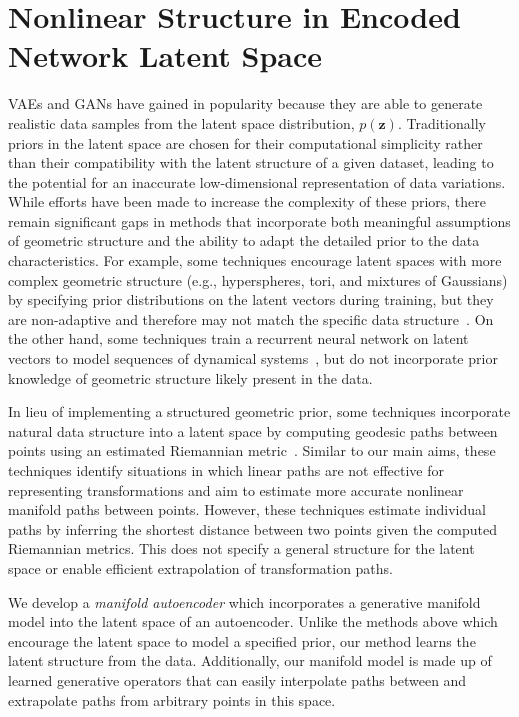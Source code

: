 \documentclass[letterpaper]{article} %
\newcommand{\vtr}[1]{\ensuremath{\mathbf{#1}}}
\begin{document}
\section{Nonlinear Structure in Encoded Network Latent Space}\label{sec:background}
VAEs and GANs have gained in popularity because they are able to generate realistic data samples from the latent space distribution, $p(\vtr{z})$. Traditionally priors in the latent space are chosen for their computational simplicity rather than their compatibility with the latent structure of a given dataset, leading to the potential for an inaccurate low-dimensional representation of data variations. While efforts have been made to increase the complexity of these priors, there remain significant gaps in methods that incorporate both meaningful assumptions of geometric structure and the ability to adapt the detailed prior to the data characteristics. For example, some techniques encourage latent spaces with more complex geometric structure (e.g., hyperspheres, tori, and mixtures of Gaussians) by specifying prior distributions on the latent vectors during training, but they are non-adaptive and therefore may not match the specific data structure~\cite{tomczak2017vae,davidson2018hyperspherical,makhzani2015adversarial,falorsi2018explorations,rey2019diffusion}. On the other hand, some techniques train a recurrent neural network on latent vectors to model sequences of dynamical systems~\cite{sussillo2016lfads}, but do not incorporate prior knowledge of geometric structure likely present in the data.


In lieu of implementing a structured geometric prior, some techniques incorporate natural data structure into a latent space by computing geodesic paths between points using an estimated Riemannian metric~\cite{arvanitidis2017latent,chen2017metrics,shao2018riemannian}. Similar to our main aims, these techniques identify situations in which linear paths are not effective for representing transformations and aim to estimate more accurate nonlinear manifold paths between points. However, these techniques estimate individual paths by inferring the shortest distance between two points given the computed Riemannian metrics. This does not specify a general structure for the latent space or enable efficient extrapolation of transformation paths.

We develop a \textit{manifold autoencoder} which incorporates a generative manifold model into the latent space of an autoencoder. Unlike the methods above which encourage the latent space to model a specified prior, our method learns the latent structure from the data. Additionally, our manifold model is made up of learned generative operators that can easily interpolate paths between and extrapolate paths from arbitrary points in this space.
\end{document}
